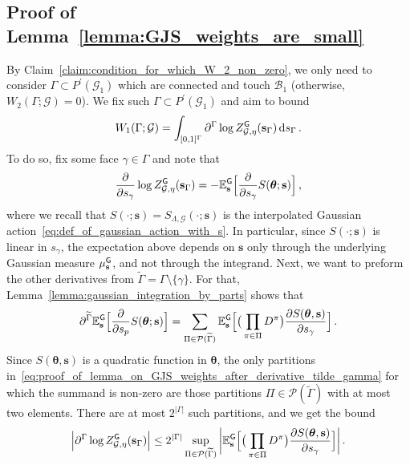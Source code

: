 \documentclass[11pt]{article}
\theoremstyle{definition}
\theoremstyle{remark}
\numberwithin{theorem}{section}
\def\La{{\Lambda}}
\def\Ga{{\Gamma}}
\newcommand{\bE}{\mathbb E}
\newcommand{\cB}{\mathcal B}
\newcommand{\cG}{\mathcal G}
\begin{document}
    \subsection{Proof of Lemma~\ref{lemma:GJS_weights_are_small}}
    By Claim~\ref{claim:condition_for_which_W_2_non_zero}, we only need to consider $\Ga\subset P^\prime(\mathcal{G}_1)$ which are connected and touch $\cB_1$ (otherwise, $W_2(\Ga;\cG) = 0$). We fix such $\Ga\subset P^\prime(\mathcal{G}_1)$ and aim to bound
    \[
    W_1(\Ga;\mathcal{G}) = \int_{[0,1]^{\Ga}} \partial^\Ga \log Z_{\mathcal{G},\eta}^{\sf G} (\mathbf{s}_\Ga) \, {\rm d} s_{\Ga}\, . 
    \]
    To do so, fix some face $\gamma \in \Ga$ and note that 
    \begin{equation*}
        \frac{\partial}{\partial s_\gamma} \log Z_{\mathcal{G},\eta}^{\sf G} (\mathbf{s}_\Ga) = -\bE_{\mathbf{s}}^{\sf G}\Big[ \frac{\partial}{\partial s_\gamma} S(\boldsymbol{\theta}; \mathbf{s}) \Big] \, ,
    \end{equation*}
    where we recall that $S(\cdot;\mathbf{s}) = S_{\La,\mathcal{G}}(\cdot;\mathbf{s})$ is the interpolated Gaussian action~\eqref{eq:def_of_gaussian_action_with_s}. In particular, since $S(\cdot;\mathbf{s})$ is linear in $s_\gamma$, the expectation above depends on $\mathbf{s}$ only through the underlying Gaussian measure $\mu_{\mathbf{s}}^{\sf G}$, and not through the integrand. Next, we want to preform the other derivatives from $\widetilde \Ga = \Ga \setminus \{\gamma\}$. For that, Lemma~\ref{lemma:gaussian_integration_by_parts} shows that 
    \begin{equation} \label{eq:proof_of_lemma_on_GJS_weights_after_derivative_tilde_gamma}
        \partial^{\widetilde \Ga} \bE_{\mathbf{s}}^{\sf G}\Big[ \frac{\partial}{\partial s_p} S(\boldsymbol{\theta}; \mathbf{s}) \Big] = \sum_{\Pi\in \mathcal{P}(\widetilde{\Ga})} \bE_{\mathbf{s}}^{\sf G} \Big[ \big(\prod_{\pi \in \Pi} D^\pi \big) \frac{\partial S(\boldsymbol{\theta}, \mathbf{s})}{ \partial s_\gamma} \Big] \, .
    \end{equation}
    Since $S(\boldsymbol{\theta},\mathbf{s})$ is a quadratic function in $\boldsymbol{\theta}$, the only partitions in~\eqref{eq:proof_of_lemma_on_GJS_weights_after_derivative_tilde_gamma} for which the summand is non-zero are those partitions $\Pi\in \mathcal{P}(\widetilde{\Ga})$ with at most two elements. There are at most $2^{|\Ga|}$ such partitions, and we get the bound 
    \[
    \Big|\partial^\Ga \log Z_{\mathcal{G},\eta}^{\sf G} (\mathbf{s}_\Ga) \Big| \le 2^{|\Ga|}  \sup_{\Pi\in \mathcal{P}(\widetilde{\Ga})} \bigg| \bE_{\mathbf{s}}^{\sf G} \Big[ \big(\prod_{\pi \in \Pi} D^\pi \big) \frac{\partial S(\boldsymbol{\theta}, \mathbf{s})}{ \partial s_\gamma} \Big]  \bigg| \, .
    \]
\end{document}
